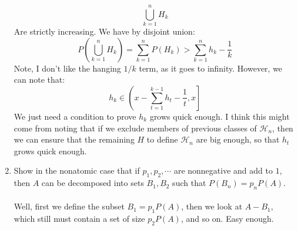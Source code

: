 \documentclass[12pt,a4paper]{article}
\newcommand{\1}[1]{\mathbbm{1}\left\{ #1 \right\}}
\newcommand{\hcal}{\mathcal{H}}
\begin{document}
\begin{enumerate}
	$$
		\bigcup_{k=1}^n H_k
	$$
	Are strictly increasing. We have by disjoint union:
	$$
		P\left(\bigcup_{k=1}^n H_k\right) = \sum_{k=1}^n P(H_k) > \sum_{k=1}^n h_k - \frac{1}{k}
	$$
	Note, I don't like the hanging $1/k$ term, as it goes to infinity. However, we can note that:
	$$
		h_k \in \left(x - \sum_{t = 1}^{k-1} h_t - \frac{1}{t}, x\right]
	$$
	We just need a condition to prove $h_k$ grows quick enough. I think this might come from noting that if we exclude members of previous classes of $\hcal_n$, then we can ensure that the remaining $H$ to define $\hcal_n$ are big enough, so that $h_t$ grows quick enough.
	
	\item Show in the nonatomic case that if $p_1, p_2, \cdots$ are nonnegative and add to $1$, then $A$ can be decomposed into sets $B_1, B_2$ such that $P(B_n) = p_nP(A)$.
	\\\\
	Well, first we define the subset $B_1 = p_1P(A)$, then we look at $A - B_1$, which still must contain a set of size $p_2P(A)$, and so on. Easy enough.

\end{enumerate}
\end{document}
